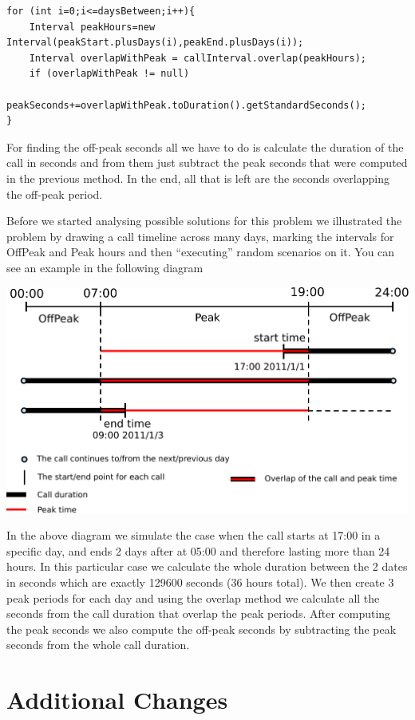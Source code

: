 \documentclass[pdftex,11pt,a4paper]{article}
\begin{document}
\begin{lstlisting}
for (int i=0;i<=daysBetween;i++){
	Interval peakHours=new Interval(peakStart.plusDays(i),peakEnd.plusDays(i));
	Interval overlapWithPeak = callInterval.overlap(peakHours);
	if (overlapWithPeak != null)
		peakSeconds+=overlapWithPeak.toDuration().getStandardSeconds();
}
\end{lstlisting}

For finding the off-peak seconds all we have to do is calculate the duration of the call in seconds and from them just subtract the peak seconds that were computed in the previous method. In the end, all that is left are the seconds overlapping the off-peak period.

Before we started analysing possible solutions for this problem we illustrated the problem by drawing a call timeline across many days, marking the intervals for OffPeak and Peak hours and then “executing” random scenarios on it. You can see an example in the following diagram

\begin{center}
	\includegraphics[scale=0.75]{images/timeline.pdf}
\end{center}

In the above diagram we simulate the case when the call starts at 17:00 in a specific day, and ends 2 days after at 05:00 and therefore lasting more than 24 hours. In this particular case we calculate the whole duration between the 2 dates in seconds which are exactly 129600 seconds (36 hours total). We then create 3 peak periods for each day and using the overlap method we calculate all the seconds from the call duration that overlap the peak periods. After computing the peak seconds we also compute the off-peak seconds by subtracting the peak seconds from the whole call duration.
\section{Additional Changes}
\end{document}
